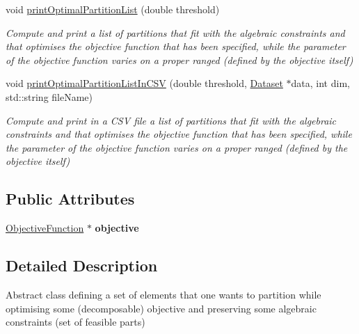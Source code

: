 \begin{DoxyCompactItemize}
void \hyperlink{classAbstractSet_ad8fd35092406335c40914c53ed2e5e34}{print\-Optimal\-Partition\-List} (double threshold)
\begin{DoxyCompactList}\small\item\em Compute and print a list of partitions that fit with the algebraic constraints and that optimises the objective function that has been specified, while the parameter of the objective function varies on a proper ranged (defined by the objective itself) \end{DoxyCompactList}\item 
void \hyperlink{classAbstractSet_ab72fbc5c1f339bb385d24565fd26d4fc}{print\-Optimal\-Partition\-List\-In\-C\-S\-V} (double threshold, \hyperlink{classDataset}{Dataset} $\ast$data, int dim, std\-::string file\-Name)
\begin{DoxyCompactList}\small\item\em Compute and print in a C\-S\-V file a list of partitions that fit with the algebraic constraints and that optimises the objective function that has been specified, while the parameter of the objective function varies on a proper ranged (defined by the objective itself) \end{DoxyCompactList}\end{DoxyCompactItemize}
\subsection*{Public Attributes}
\begin{DoxyCompactItemize}
\item 
\hypertarget{classAbstractSet_a0217447a042827703e1ea7655f0fc099}{\hyperlink{classObjectiveFunction}{Objective\-Function} $\ast$ {\bfseries objective}}\label{classAbstractSet_a0217447a042827703e1ea7655f0fc099}

\end{DoxyCompactItemize}


\subsection{Detailed Description}
Abstract class defining a set of elements that one wants to partition while optimising some (decomposable) objective and preserving some algebraic constraints (set of feasible parts) 

